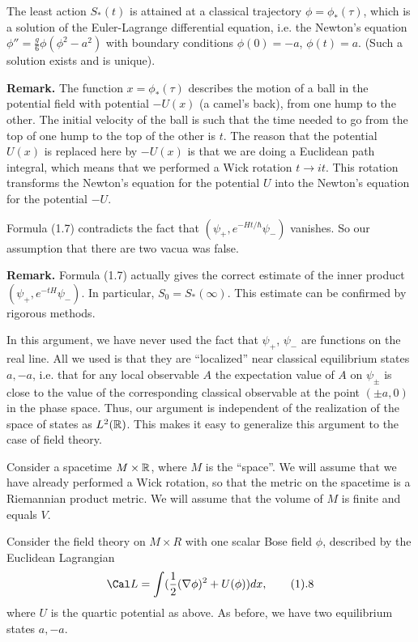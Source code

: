The least action $S_*(t)$ is attained at a classical trajectory
$\phi=\phi_*(\tau)$, which is a solution of the 
Euler-Lagrange differential equation,
i.e. the Newton's equation $\phi''=\frac{g}{6}\phi(\phi^2-a^2)$
with boundary conditions $\phi(0)=-a$, $\phi(t)=a$. 
(Such a solution exists and is unique).

{\bf Remark.} The function $x=\phi_*(\tau)$ describes the motion 
of a ball in the potential field with potential $-U(x)$ (a camel's back),
from one hump to the other. The initial velocity of the ball is such that
the time needed to go from the top of one hump to the top of the other is $t$. 
The reason that the potential $U(x)$ is replaced here by $-U(x)$ is that 
we are doing a Euclidean path integral, which means that we performed 
a Wick rotation $t\to it$. This rotation transforms the Newton's equation 
for the potential $U$ into the Newton's equation for the potential $-U$. 

Formula (1.7) contradicts the fact that $(\psi_+,e^{-Ht/\hbar}\psi_-)$
vanishes. So our assumption that there are two vacua was false. 

{\bf Remark.} Formula (1.7) actually gives the correct estimate 
of the inner product $(\psi_+,e^{-tH}\psi_-)$. In particular,
$S_0=S_*(\infty)$. 
This estimate can be confirmed
by rigorous methods. 

In this argument, we have never used the fact that $\psi_+$, $\psi_-$ 
are functions on the real line. All we used is that they are ``localized'' 
near classical equilibrium states $a,-a$, i.e. that for any local 
observable $A$ the expectation value of $A$ on $\psi_\pm$ is close
to the value of the corresponding classical observable at 
the point $(\pm a,0)$ in the phase space. Thus, our argument is independent
of the realization of the space of states as $L^2(\Bbb R)$. This makes it easy 
to generalize this argument to the case of field theory.

Consider a spacetime $M\times \Bbb R$, where 
$M$ is the ``space''. We will assume that we have already performed
a Wick rotation, so that the metric on the spacetime is a Riemannian product metric. 
We will assume that the volume of $M$ is finite and equals $V$. 

Consider the field theory on $M\times R$
with one scalar Bose field $\phi$, described by the Euclidean Lagrangian 
$$
\Cal L=\int (\frac{1}{2}(\nabla\phi)^2+U(\phi))dx, \tag 1.8
$$
where $U$ is the quartic potential as above. As before, we have two 
equilibrium states $a,-a$.

